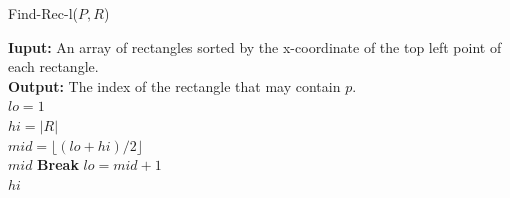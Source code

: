 \documentclass[11pt]{article}
\begin{document}
\begin{enumerate}
\begin{enumerate}
\begin{algorithm} [h]
    \caption{Find-Rec-l($P, R$)}

     {
        \textbf{Iuput:} An array of rectangles sorted by the x-coordinate of the top left point 
        of each rectangle.\\
        \textbf{Output:} The index of the rectangle that may contain $p$.\\
        $lo = 1$\\
        $hi = \lvert R \rvert$\\
         {
            $mid = \lfloor (lo + hi) / 2 \rfloor$\\
             {
                \Return $mid$
                \textbf{Break}
            }  {
                $lo = mid + 1$\\
            } 
        }
        \Return $hi$
    }


\end{algorithm}
\end{enumerate}
\end{enumerate}
\end{document}
